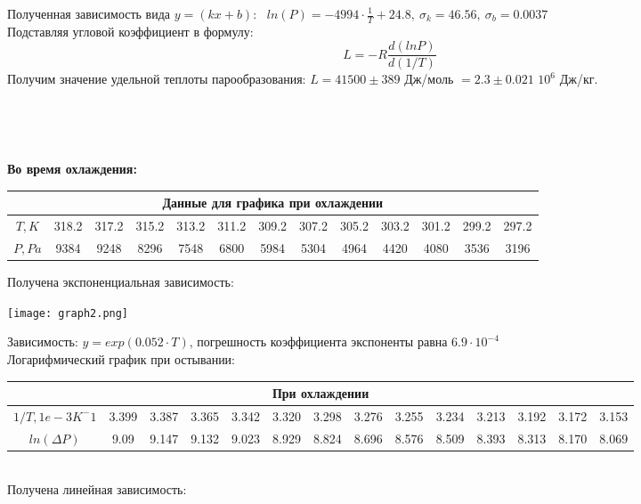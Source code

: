 \documentclass[a4paper,10pt]{article} %
\begin{document}
Полученная зависимость вида $y = (kx + b)$: \
$ln(P) = -4994\cdot \frac{1}{T} + 24.8,\ \sigma_k = 46.56, \ \sigma_b = 0.0037$\\
Подставляя угловой коэффициент в формулу:
$$L = -R\frac{d(lnP)}{d(1/T)}$$
Получим значение удельной теплоты парообразования: $L = 41500 \pm 389$ Дж/моль $= 2.3 \pm 0.021$ $10^{6}$ Дж/кг.\\

\medskip

\

\

\newline
\textbf{Во время охлаждения:}\\


\begin{center}
\begin{tabular}{|c|c|c|c|c|c|c|c|c|c|c|c|c|}
\hline
\multicolumn{13}{|c|}{Данные для графика при охлаждении}\\
\hline
$T, K$&318.2&317.2&315.2&313.2&311.2&309.2&307.2&305.2&303.2&301.2&299.2&297.2\\\hline
$P, Pa$&9384&9248&8296&7548&6800&5984&5304&4964&4420&4080&3536&3196\\\hline
\end{tabular}
\end{center}

Получена экспоненциальная зависимость: \\

\begin{center}
	\texttt{[image: graph2.png]}
\end{center}

Зависимость: $y = exp(0.052\cdot T)$, погрешность коэффициента экспоненты равна $6.9\cdot 10^{-4}$\\
Логарифмический график при остывании:\\

\begin{tabular}{|c|c|c|c|c|c|c|c|c|c|c|c|c|c|}
\hline
\multicolumn{14}{|c|}{При охлаждении}\\
\hline
$1/T, 1e-3 K^-1$&3.399&3.387&3.365&3.342&3.320&3.298&3.276&3.255&3.234&3.213&3.192&3.172&3.153\\\hline
$ln(\Delta P)$&9.09&9.147&9.132&9.023&8.929&8.824&8.696&8.576&8.509&8.393&8.313&8.170&8.069\\\hline
\end{tabular}\\

Получена линейная зависимость: \\
\end{document}
